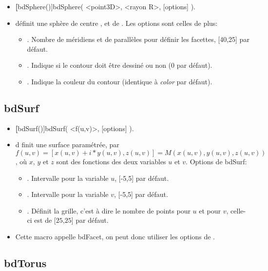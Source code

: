 \begin{itemize}
 \item \util \textbf[bdSphere()]{bdSphere( <point3D>, <rayon R>, [options] )}.
 \item \desc définit une sphère de centre , et de . Les options sont celles de  plus:

  \begin{itemize}
  \item {}. Nombre de méridiens et de parallèles pour définir les facettes, [40,25] par défaut.
  \item {}. Indique si le contour doit être dessiné ou non (0 par défaut).
  \item {}. Indique la couleur du contour (identique à \textit{color} par défaut).
  \end{itemize}
\end{itemize}

\subsection{bdSurf}

\begin{itemize}
 \item \util \textbf[bdSurf()]{bdSurf( <f(u,v)>, [options] )}.
 \item \desc d finit une surface paramétrée, par $f(u,v)=[x(u,v)+i*y(u,v), z(u,v)]=M(x(u,v),y(u,v),z(u,v))$, où $x$, $y$ et $z$ sont des fonctions des deux variables $u$ et $v$. Options de bdSurf: 

  \begin{itemize}
  \item {}. Intervalle pour la variable $u$, [-5,5] par défaut.
  \item {}. Intervalle pour la variable $v$, [-5,5] par défaut.
  \item {}. Définit la grille, c'est à dire le nombre de points pour $u$ et pour $v$, celle-ci est de [$25$,$25$] par défaut.
  \end{itemize}
 \item Cette macro appelle bdFacet, on peut donc utiliser les options de .
\end{itemize}


\subsection{bdTorus}

